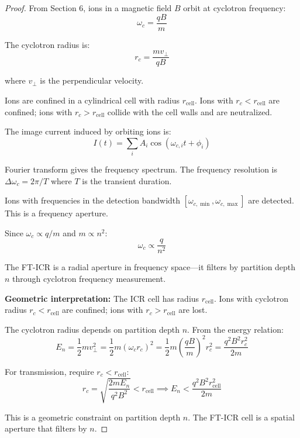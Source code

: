 \begin{proof}
From Section 6, ions in a magnetic field $B$ orbit at cyclotron frequency:
\begin{equation}
\omega_c = \frac{qB}{m}
\end{equation}

The cyclotron radius is:
\begin{equation}
r_c = \frac{mv_\perp}{qB}
\end{equation}

where $v_\perp$ is the perpendicular velocity.

Ions are confined in a cylindrical cell with radius $r_{\text{cell}}$. Ions with $r_c < r_{\text{cell}}$ are confined; ions with $r_c > r_{\text{cell}}$ collide with the cell walls and are neutralized.

The image current induced by orbiting ions is:
\begin{equation}
I(t) = \sum_i A_i \cos(\omega_{c,i} t + \phi_i)
\end{equation}

Fourier transform gives the frequency spectrum. The frequency resolution is $\Delta\omega_c = 2\pi/T$ where $T$ is the transient duration.

Ions with frequencies in the detection bandwidth $[\omega_{c,\min}, \omega_{c,\max}]$ are detected. This is a frequency aperture.

Since $\omega_c \propto q/m$ and $m \propto n^2$:
\begin{equation}
\omega_c \propto \frac{q}{n^2}
\end{equation}

The FT-ICR is a radial aperture in frequency space—it filters by partition depth $n$ through cyclotron frequency measurement.

\textbf{Geometric interpretation:} The ICR cell has radius $r_{\text{cell}}$. Ions with cyclotron radius $r_c < r_{\text{cell}}$ are confined; ions with $r_c > r_{\text{cell}}$ are lost.

The cyclotron radius depends on partition depth $n$. From the energy relation:
\begin{equation}
E_n = \frac{1}{2}mv_\perp^2 = \frac{1}{2}m(\omega_c r_c)^2 = \frac{1}{2}m\left(\frac{qB}{m}\right)^2 r_c^2 = \frac{q^2B^2 r_c^2}{2m}
\end{equation}

For transmission, require $r_c < r_{\text{cell}}$:
\begin{equation}
r_c = \sqrt{\frac{2mE_n}{q^2B^2}} < r_{\text{cell}} \implies E_n < \frac{q^2B^2 r_{\text{cell}}^2}{2m}
\end{equation}

This is a geometric constraint on partition depth $n$. The FT-ICR cell is a spatial aperture that filters by $n$.
\end{proof}

